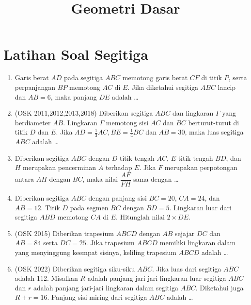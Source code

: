 \documentclass[12pt]{scrartcl}
\begin{document}
\title{Geometri Dasar}
\maketitle

\renewcommand*\contentsname{Daftar Isi}
\tableofcontents

\newpage
\section{Latihan Soal Segitiga }
\begin{enumerate}    
    \item Garis berat $AD$ pada segitiga $ABC$ memotong garis berat $CF$ di titik $P$, serta perpanjangan $BP$ memotong $AC$ di $E$. Jika diketahui segitiga $ABC$ lancip dan $AB=6$, maka panjang $DE$ adalah \dots

    \item (OSK 2011,2012,2013,2018) Diberikan segitiga $ABC$ dan lingkaran $\Gamma$ yang berdiameter $AB$. Lingkaran $\Gamma$ memotong sisi $AC$ dan $BC$ berturut-turut di titik $D$ dan $E$. Jika $AD = \frac13 AC, BE =\frac14 BC$ dan $AB = 30$, maka luas segitiga $ABC$ adalah \dots
		
    \item Diberikan segitiga $ABC$ dengan $D$ titik tengah $AC$, $E$ titik tengah $BD$, dan $H$ merupakan pencerminan $A$ terhadap $E$. Jika $F$ merupakan perpotongan antara $AH$ dengan $BC$, maka nilai $\dfrac{AF}{FH}$ sama dengan \dots
		 
    \item Diberikan segitiga $ABC$ dengan panjang sisi $BC = 20$, $CA = 24$, dan $AB=12$. Titik $D$ pada segmen $BC$ dengan $BD = 5$. Lingkaran luar dari segitiga $ABD$ memotong $CA$ di $E$. Hitunglah nilai $2 \times DE$.

    \item (OSK 2015) Diberikan trapesium $ABCD$ dengan $AB$ sejajar $DC$ dan $AB = 84$ serta $DC = 25$. Jika trapesium $ABCD$ memiliki lingkaran dalam yang menyinggung keempat sisinya, keliling trapesium $ABCD$ adalah \ldots

    \item (OSK 2022) Diberikan segitiga siku-siku $ABC$. Jika luas dari segitiga $ABC$ adalah 112. Misalkan $R$ adalah panjang jari-jari lingkaran luar segitiga $ABC$ dan $r$ adalah panjang jari-jari lingkaran dalam segitiga $ABC$. Diketahui juga $R + r = 16$. Panjang sisi miring dari segitiga $ABC$ adalah \ldots
\end{enumerate}
\end{document}
